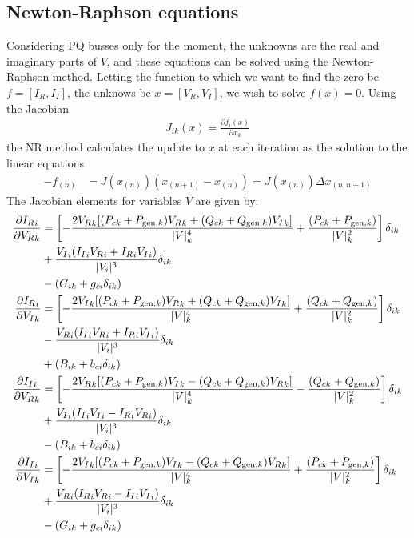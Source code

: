 \documentclass[11pt]{article}
\newcommand{\Vr}{{V_R}}
\newcommand{\Vi}{{V_I}}
\newcommand{\Ir}{{I_R}}
\newcommand{\Ii}{{I_I}}
\begin{document}
\subsection{Newton-Raphson equations}
Considering PQ busses only for the moment, the unknowns are the real and imaginary parts of $V$, and these equations can be solved using the Newton-Raphson method. Letting the function to which we want to find the zero be $f = [\Ir, \Ii]$, the unknows be $x = [\Vr, \Vi]$, we wish to solve $f(x) = 0$. Using the Jacobian
\begin{align}
J_{ik}(x) = \frac{\partial f_i(x)}{\partial x_k}
\end{align}
the NR method calculates the update to $x$ at each iteration as the solution to the linear equations
\begin{align}
-f_{(n)} &= J(x_{(n)})(x_{(n+1)}-x_{(n)}) = J(x_{(n)})\Delta x_{(n,n+1)}
\label{EQ_NR}
\end{align}
The Jacobian elements for variables $V$ are given by:
\begin{align}
	\frac{\partial \Ir_i}{\partial \Vr_{k}} 
		&= \left[-\frac{2\Vr_k[(P_{ck} + P_{\text{gen},k})\Vr_k + (Q_{ck} + Q_{\text{gen},k})\Vi_k]}{|V|_k^4} + \frac{(P_{ck} + P_{\text{gen},k})}{|V|_k^2}\right]\delta_{ik} \notag \\
		&+ \frac{\Vi_i(\Ii_i\Vr_i + \Ir_i\Vi_i)}{|V_i|^3}\delta_{ik} \notag \\
		&- (G_{ik} + g_{ci}\delta_{ik}) \\
	\frac{\partial \Ir_i}{\partial \Vi_{k}} 
		&= \left[-\frac{2\Vi_k[(P_{ck} + P_{\text{gen},k})\Vr_k + (Q_{ck} + Q_{\text{gen},k})\Vi_k]}{|V|_k^4} + \frac{(Q_{ck} + Q_{\text{gen},k})}{|V|_k^2} \right]\delta_{ik} \notag \\
		&- \frac{\Vr_i(\Ii_i\Vr_i + \Ir_i\Vi_i)}{|V_i|^3}\delta_{ik} \notag \\
		&+ (B_{ik} + b_{ci}\delta_{ik}) \\
	\frac{\partial \Ii_i}{\partial \Vr_{k}}
		&= \left[-\frac{2\Vr_k[(P_{ck} + P_{\text{gen},k})\Vi_k - (Q_{ck} + Q_{\text{gen},k})\Vr_k]}{|V|_k^4} - \frac{(Q_{ck} + Q_{\text{gen},k})}{|V|_k^2} \right]\delta_{ik} \notag \\
		&+ \frac{\Vi_i(\Ii_i\Vi_i - \Ir_i\Vr_i)}{|V_i|^3}\delta_{ik} \notag \\
		&- (B_{ik} + b_{ci}\delta_{ik}) \\
	\frac{\partial \Ii_i}{\partial \Vi_{k}}
		&= \left[-\frac{2\Vi_k[(P_{ck} + P_{\text{gen},k})\Vi_k - (Q_{ck} + Q_{\text{gen},k})\Vr_k]}{|V|_k^4} + \frac{(P_{ck} + P_{\text{gen},k})}{|V|_k^2} \right] \delta_{ik} \notag \\
		&+ \frac{\Vr_i(\Ir_i\Vr_i - \Ii_i\Vi_i)}{|V_i|^3}\delta_{ik} \notag \\
		&- (G_{ik} + g_{ci}\delta_{ik})
\end{align}
\end{document}
